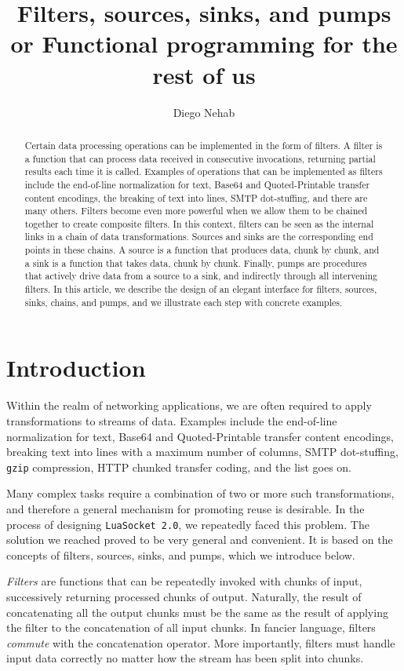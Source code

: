 \documentclass[10pt]{article}
\title{Filters, sources, sinks, and pumps\\
      {\large or Functional programming for the rest of us}}
\author{Diego Nehab}
\begin{document}
\maketitle

\begin{abstract}
Certain data processing operations can be implemented in the
form of filters. A filter is a function that can process
data received in consecutive invocations, returning partial
results each time it is called.  Examples of operations that
can be implemented as filters include the end-of-line
normalization for text, Base64 and Quoted-Printable transfer
content encodings, the breaking of text into lines, SMTP
dot-stuffing, and there are many others.  Filters become
even more powerful when we allow them to be chained together
to create composite filters. In this context, filters can be
seen as the internal links in a chain of data transformations.
Sources and sinks are the corresponding end points in these
chains. A source is a function that produces data, chunk by
chunk, and a sink is a function that takes data, chunk by
chunk. Finally, pumps are procedures that actively drive
data from a source to a sink, and indirectly through all
intervening filters.  In this article, we describe the design of an
elegant interface for filters, sources, sinks, chains, and
pumps, and we illustrate each step with concrete examples.
\end{abstract}

\section{Introduction}

Within the realm of networking applications, we are often
required to apply transformations to streams of data. Examples
include the end-of-line normalization for text, Base64 and
Quoted-Printable transfer content encodings, breaking text
into lines with a maximum number of columns, SMTP
dot-stuffing, \texttt{gzip} compression, HTTP chunked
transfer coding, and the list goes on.

Many complex tasks require a combination of two or more such
transformations, and therefore a general mechanism for
promoting reuse is desirable. In the process of designing
\texttt{LuaSocket~2.0}, we repeatedly faced this problem.
The solution we reached proved to be very general and
convenient. It is based on the concepts of filters, sources,
sinks, and pumps, which we introduce below.

\emph{Filters} are functions that can be repeatedly invoked
with chunks of input, successively returning processed
chunks of output. Naturally, the result of
concatenating all the output chunks must be the same as the
result of applying the filter to the concatenation of all
input chunks. In fancier language, filters \emph{commute}
with the concatenation operator. More importantly, filters
must handle input data correctly no matter how the stream
has been split into chunks.
\end{document}
